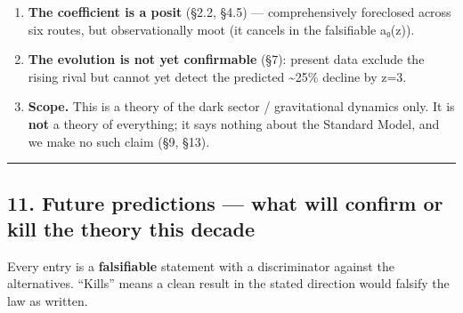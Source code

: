 \documentclass[
]{article}
\begin{document}
\begin{enumerate}
  Sitter/DSSYK dictionary (§4.4), via a \emph{computed} matter-chord
  kernel that also predicts the cluster failure. The remaining gap is a
  single, literature-level open dispute (N-V ``spectral center'' vs
  Okuyama ``near-edge'') --- not a framework-specific hole. Stronger
  than the prior ``half-forced,'' weaker than a theorem.
\item
  \textbf{The coefficient is a posit} (§2.2, §4.5) --- comprehensively
  foreclosed across six routes, but observationally moot (it cancels in
  the falsifiable a₀(z)).
\item
  \textbf{The evolution is not yet confirmable} (§7): present data
  exclude the rising rival but cannot yet detect the predicted
  \textasciitilde25\% decline by z=3.
\item
  \textbf{Scope.} This is a theory of the dark sector / gravitational
  dynamics only. It is \textbf{not} a theory of everything; it says
  nothing about the Standard Model, and we make no such claim (§9, §13).
\end{enumerate}

\begin{center}\rule{0.5\linewidth}{0.5pt}\end{center}

\subsection{11. Future predictions --- what will confirm or kill the
theory this
decade}\label{future-predictions-what-will-confirm-or-kill-the-theory-this-decade}

Every entry is a \textbf{falsifiable} statement with a discriminator
against the alternatives. ``Kills'' means a clean result in the stated
direction would falsify the law as written.
\end{document}
